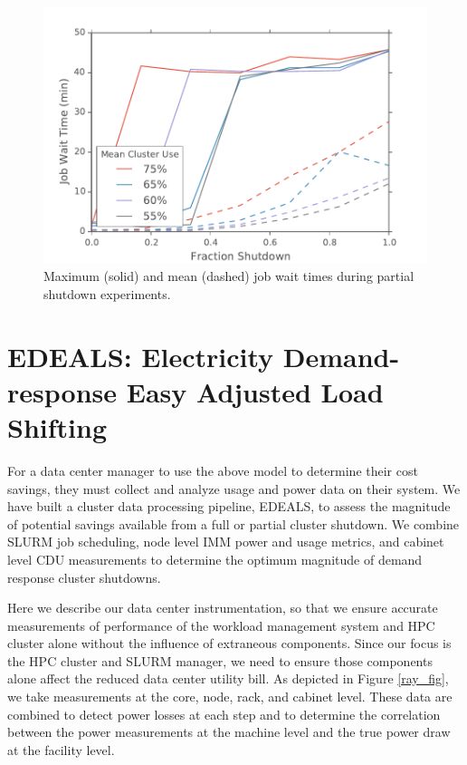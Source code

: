\begin{figure}[t]
	\begin{center}
		\includegraphics[scale=0.55]{edeals/down_v_wait}
	\end{center}
	\caption{Maximum (solid) and mean (dashed) job wait times during partial shutdown experiments.}
	\label{down_v_wait}
\end{figure}

\section{EDEALS: Electricity Demand-response Easy Adjusted Load Shifting}

For a data center manager to use the above model to determine their cost savings, they must collect and analyze usage and power data on their system.  We have built a cluster data processing pipeline, EDEALS, to assess the magnitude of potential savings available from a full or partial cluster shutdown.  We combine SLURM job scheduling, node level IMM power and usage metrics, and cabinet level CDU measurements to determine the optimum magnitude of demand response cluster shutdowns.  

Here we describe our data center instrumentation, so that we ensure accurate measurements of performance of the workload management system and HPC cluster alone without the influence of extraneous components. Since our focus is the HPC cluster and SLURM manager, we need to ensure those components alone affect the reduced data center utility bill.  As depicted in Figure \ref{ray_fig}, we take measurements at the core, node, rack, and cabinet level.  These data are combined to detect power losses at each step and to determine the correlation between the power measurements at the machine level and the true power draw at the facility level.

